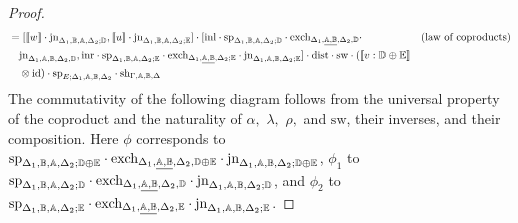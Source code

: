 \documentclass[10pt,a4paper]{amsart}
\theoremstyle{definition}
\theoremstyle{definition}
\theoremstyle{definition}
\theoremstyle{definition}
\theoremstyle{definition}
\theoremstyle{definition}
\begin{document}
\begin{proof}
\begin{align*}
  & = [[\![ w ]\!] \cdot \text{jn}_{\Delta_{1} ,\mathbb{B},\mathbb{A},  \Delta_{2};\mathbb{D}},  [\![u ]\!] \cdot \text{jn}_{\Delta_{1} ,\mathbb{B},\mathbb{A},  \Delta_{2};\mathbb{E}}] \cdot [\mathrm{inl} \cdot  \text{sp}_{\Delta_{1}, \mathbb{B}, \mathbb{A}, \Delta_{2};\mathbb{D}} \cdot  \text{exch}_{\Delta_{1},\underline{\mathbb{A},\mathbb{B}},  \Delta_{2},\mathbb{D}} \cdot  & {\text{(law of coproducts)}} \\
  & \hspace{10pt}  \text{jn}_{\Delta_{1},\mathbb{A},\mathbb{B},  \Delta_{2},\mathbb{D}}, \mathrm{inr} \cdot  \text{sp}_{\Delta_{1}, \mathbb{B}, \mathbb{A}, \Delta_{2};\mathbb{E}} \cdot  \text{exch}_{\Delta_{1},\underline{\mathbb{A},\mathbb{B}},  \Delta_{2};\mathbb{E}} \cdot  \text{jn}_{\Delta_{1},\mathbb{A},\mathbb{B},  \Delta_{2};\mathbb{E}} ] \cdot \text{dist} \cdot \text{sw} \cdot ([\![  v : \mathbb{D} \oplus \mathbb{E}  ]\!] \\
  & \hspace{10pt} \otimes \text{id})  \cdot\text{sp}_{E; \Delta_{1},\mathbb{A},\mathbb{B},  \Delta_{2}} \cdot \text{sh}_{\Gamma,\mathbb{A}, \mathbb{B},\Delta} \\ 
\end{align*}
The commutativity of the following diagram follows from the universal property of the coproduct and the naturality of $\alpha,$ $\lambda,$ $\rho,$ and $\text{sw}$, their inverses, and their composition. Here $\phi$ corresponds to $\text{sp}_{\Delta_{1}, \mathbb{B}, \mathbb{A}, \Delta_{2}; \mathbb{D} \oplus\mathbb{E}} \cdot  \text{exch}_{\Delta_{1},\underline{\mathbb{A},\mathbb{B}},  \Delta_{2}, \mathbb{D} \oplus\mathbb{E}} \cdot  \text{jn}_{\Delta_{1},\mathbb{A},\mathbb{B},  \Delta_{2}; \mathbb{D} \oplus\mathbb{E}}$, $\phi_1$ to $\text{sp}_{\Delta_{1}, \mathbb{B}, \mathbb{A}, \Delta_{2}; \mathbb{D}} \cdot  \text{exch}_{\Delta_{1},\underline{\mathbb{A},\mathbb{B}},  \Delta_{2}, \mathbb{D}} \cdot  \text{jn}_{\Delta_{1},\mathbb{A},\mathbb{B},  \Delta_{2}; \mathbb{D}}$, and $\phi_2$ to $\text{sp}_{\Delta_{1}, \mathbb{B}, \mathbb{A}, \Delta_{2}; \mathbb{E}} \cdot  \text{exch}_{\Delta_{1},\underline{\mathbb{A},\mathbb{B}},  \Delta_{2}, \mathbb{E}} \cdot  \text{jn}_{\Delta_{1},\mathbb{A},\mathbb{B},  \Delta_{2}; \mathbb{E}}$.


\end{proof}
\end{document}
